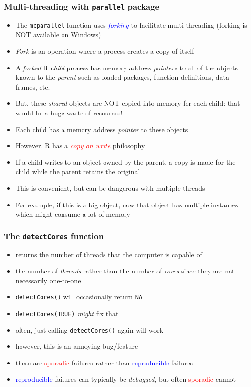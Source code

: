 \documentclass[11pt,pdftex,dvipsnames,usenames,helvetica]{beamer}
\begin{document}
\begin{frame}[fragile]
\frametitle{Multi-threading with {\tt parallel} package}

\begin{itemize}
\item The {\tt mcparallel} function uses \textcolor{blue}{\it forking}
  to facilitate multi-threading (forking is NOT available on Windows)
\item {\it Fork} is an operation where a process creates a copy of itself
\item A {\it forked} R {\it child} process has memory address {\it
    pointers} to all of the objects known to the {\it parent} such as
  loaded packages, function definitions, data frames, etc.
\item But, these {\it shared} objects are NOT copied into memory
  for each child: that would be a huge waste of resources!
\item Each child has a memory address {\it pointer} to these objects
\item However, R has a \textcolor{red}{\it copy on write} philosophy
\item If a child writes to an object owned by the parent, a copy
is made for the child while the parent retains the original
\item This is convenient, but can be dangerous with multiple threads
\item For example, if this is a big object, now that object has
multiple instances which might consume a lot of memory 
\end{itemize}
\end{frame}


\begin{frame}[fragile]
\frametitle{The {\tt detectCores} function}

\begin{itemize}
\item returns the number of threads that the computer is capable of
\item the number of {\it threads} rather than the number of {\it cores}
since they are not necessarily one-to-one
\item {\tt detectCores()} will occasionally return {\tt NA}
\item {\tt detectCores(TRUE)} {\it might} fix that
\item often, just calling {\tt detectCores()} again will work
\item however, this is an annoying bug/feature
\item these are \textcolor{red}{sporadic} failures
rather than \textcolor{blue}{reproducible} failures
\item \textcolor{blue}{reproducible} failures can typically
be {\it debugged}, but often \textcolor{red}{sporadic} cannot
\end{itemize}
\end{frame}
\end{document}
